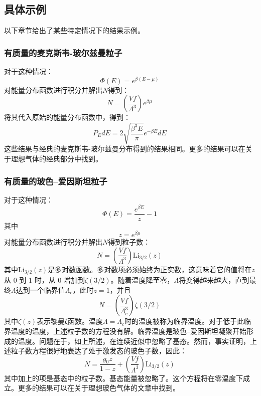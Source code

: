 \subsection{具体示例}  
以下章节给出了某些特定情况下的结果示例。
\subsubsection{有质量的麦克斯韦-玻尔兹曼粒子}  
对于这种情况：
\[
\Phi(E) = e^{\beta (E - \mu)}~
\]
对能量分布函数进行积分并解出\( N \)得到：
\[
N = \left( \frac{Vf}{\Lambda^3} \right) e^{\beta \mu}~
\]
将其代入原始的能量分布函数中，得到：
\[
P_E dE = 2 \sqrt{\frac{\beta^3 E}{\pi}} e^{-\beta E} dE~
\]
这些结果与经典的麦克斯韦-玻尔兹曼分布得到的结果相同。更多的结果可以在关于理想气体的经典部分中找到。
\subsubsection{有质量的玻色–爱因斯坦粒子}  
对于这种情况：
\[
\Phi(E) = \frac{e^{\beta E}}{z} - 1~
\]
其中
\[
z = e^{\beta \mu}~
\]
对能量分布函数进行积分并解出\( N \)得到粒子数：
\[
N = \left( \frac{Vf}{\Lambda^3} \right) \text{Li}_{3/2}(z)~
\]
其中\( \text{Li}_{3/2}(z) \)是多对数函数。多对数项必须始终为正实数，这意味着它的值将在\( z \)从 0 到 1 时，从 0 增加到\( \zeta(3/2) \)。随着温度降至零，\( \Lambda \)将变得越来越大，直到最终\( \Lambda \)达到一个临界值\( \Lambda_c \)，此时\( z = 1 \)，并且
\[
N = \left( \frac{Vf}{\Lambda_c^3} \right) \zeta(3/2)~
\]
其中\( \zeta(z) \)表示黎曼ζ函数。温度\( \Lambda = \Lambda_c \)时的温度被称为临界温度。对于低于此临界温度的温度，上述粒子数的方程没有解。临界温度是玻色–爱因斯坦凝聚开始形成的温度。问题在于，如上所述，在连续近似中忽略了基态。然而，事实证明，上述粒子数方程很好地表达了处于激发态的玻色子数，因此：
\[
N = \frac{g_0 z}{1 - z} + \left( \frac{Vf}{\Lambda^3} \right) \text{Li}_{3/2}(z)~
\]
其中加上的项是基态中的粒子数。基态能量被忽略了。这个方程将在零温度下成立。更多的结果可以在关于理想玻色气体的文章中找到。
